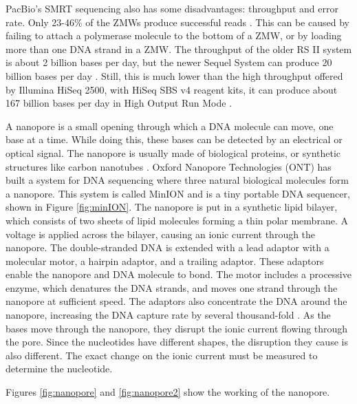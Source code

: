 \documentclass[../main/thesis.tex]{subfiles}
\begin{document}
PacBio's SMRT sequencing also has some disadvantages: throughput and error rate.
Only 23-46\% of the ZMWs produce successful reads \cite{history_sequencing}.
This can be caused by failing to attach a polymerase molecule to the bottom of a ZMW, or by loading more than one DNA strand in a ZMW.
The throughput of the older RS II system is about 2 billion bases per day, but the newer Sequel System can produce 20 billion bases per day \cite{pacbio_throughput}.
Still, this is much lower than the high throughput offered by Illumina HiSeq 2500, with HiSeq SBS v4 reagent kits, it can produce about 167 billion bases per day in High Output Run Mode \cite{pacbio}.


A nanopore is a small opening through which a DNA molecule can move, one base at a time.
While doing this, these bases can be detected by an electrical or optical signal.
The nanopore is usually made of biological proteins, or synthetic structures like carbon nanotubes \cite{nanotubes}.
Oxford Nanopore Technologies (ONT) has built a system for DNA sequencing where three natural biological molecules form a nanopore.
This system is called MinION and is a tiny portable DNA sequencer, shown in Figure \ref{fig:minION}.
The nanopore is put in a synthetic lipid bilayer, which consists of two sheets of lipid molecules forming a thin polar membrane.
A voltage is applied across the bilayer, causing an ionic current through the nanopore.
The double-stranded DNA is extended with a lead adaptor with a molecular motor, a hairpin adaptor, and a trailing adaptor.
These adaptors enable the nanopore and DNA molecule to bond.
The motor includes a processive enzyme, which denatures the DNA strands, and moves one strand through the nanopore at sufficient speed.
The adaptors also concentrate the DNA around the nanopore, increasing the DNA capture rate by several thousand-fold \cite{minION}.
As the bases move through the nanopore, they disrupt the ionic current flowing through the pore.
Since the nucleotides have different shapes, the disruption they cause is also different.
The exact change on the ionic current must be measured to determine the nucleotide.

Figures \ref{fig:nanopore} and \ref{fig:nanopore2} show the working of the nanopore.


\end{document}
